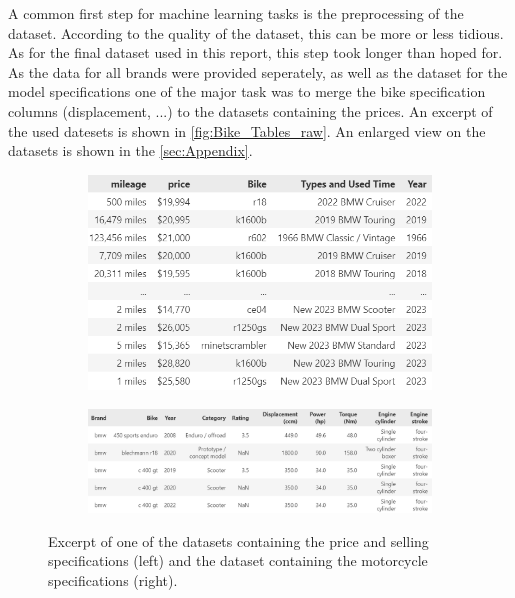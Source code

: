 A common first step for machine learning tasks is the preprocessing of the dataset. According to the quality of the dataset, this 
can be more or less tidious. As for the final dataset used in this report, this step took longer than hoped for. As the data for all brands
were provided seperately, as well as the dataset for the model specifications one of the major task was to merge the bike specification columns (displacement, ...)
to the datasets containing the prices. An excerpt of the used datesets is shown in \autoref{fig:Bike_Tables_raw}. An enlarged view on the
datasets is shown in the \autoref{sec:Appendix}.
\begin{figure}
    \centering
    \begin{subfigure}[h]{0.325\textwidth}
        \centering
        \includegraphics[width=\textwidth]{"content/pics/df_bmw_raw.png"}
    \end{subfigure}
    \hfill
    \begin{subfigure}[h]{0.66\textwidth}
        \centering
        \includegraphics[width=\textwidth]{"content/pics/df_bikez_raw.png"}
    \end{subfigure}
    \caption{Excerpt of one of the datasets containing the price and selling specifications (left) and the dataset
    containing the motorcycle specifications (right).}
    \label{fig:Bike_Tables_raw}
\end{figure}
